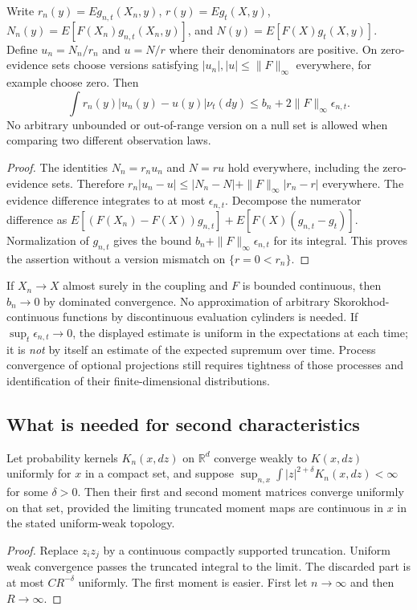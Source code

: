 \begin{theorem}
\label{thm:r33-c2-evidence}
Write $r_n(y)=E g_{n,t}(X_n,y)$, $r(y)=E g_t(X,y)$, $N_n(y)=E[F(X_n)g_{n,t}(X_n,y)]$, and $N(y)=E[F(X)g_t(X,y)]$. Define $u_n=N_n/r_n$ and $u=N/r$ where their denominators are positive. On zero-evidence sets choose versions satisfying $|u_n|,|u|\le\|F\|_\infty$ everywhere, for example choose zero. Then
\[
 \int r_n(y)|u_n(y)-u(y)|\nu_t(dy)
 \le b_n+2\|F\|_\infty\epsilon_{n,t}.
\]
No arbitrary unbounded or out-of-range version on a null set is allowed when comparing two different observation laws.
\end{theorem}
\begin{proof}
The identities $N_n=r_nu_n$ and $N=ru$ hold everywhere, including the zero-evidence sets. Therefore $r_n|u_n-u|\le|N_n-N|+\|F\|_\infty|r_n-r|$ everywhere. The evidence difference integrates to at most $\epsilon_{n,t}$. Decompose the numerator difference as $E[(F(X_n)-F(X))g_{n,t}]+E[F(X)(g_{n,t}-g_t)]$. Normalization of $g_{n,t}$ gives the bound $b_n+\|F\|_\infty\epsilon_{n,t}$ for its integral. This proves the assertion without a version mismatch on $\{r=0<r_n\}$.
\end{proof}

If $X_n\to X$ almost surely in the coupling and $F$ is bounded continuous, then $b_n\to0$ by dominated convergence. No approximation of arbitrary Skorokhod-continuous functions by discontinuous evaluation cylinders is needed. If $\sup_t\epsilon_{n,t}\to0$, the displayed estimate is uniform in the expectations at each time; it is \emph{not} by itself an estimate of the expected supremum over time. Process convergence of optional projections still requires tightness of those processes and identification of their finite-dimensional distributions.

\subsection{What is needed for second characteristics}
\begin{lemma}
\label{lem:r33-c2-moments}
Let probability kernels $K_n(x,dz)$ on $\mathbb R^d$ converge weakly to $K(x,dz)$ uniformly for $x$ in a compact set, and suppose $\sup_{n,x}\int|z|^{2+\delta}K_n(x,dz)<\infty$ for some $\delta>0$. Then their first and second moment matrices converge uniformly on that set, provided the limiting truncated moment maps are continuous in $x$ in the stated uniform-weak topology.
\end{lemma}
\begin{proof}
Replace $z_iz_j$ by a continuous compactly supported truncation. Uniform weak convergence passes the truncated integral to the limit. The discarded part is at most $CR^{-\delta}$ uniformly. The first moment is easier. First let $n\to\infty$ and then $R\to\infty$.
\end{proof}

